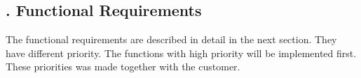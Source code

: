 \subsection{. Functional Requirements}
	The functional requirements are described in detail in the next section. They have different priority. The functions with high priority will be implemented first. These priorities was made together with the customer.
